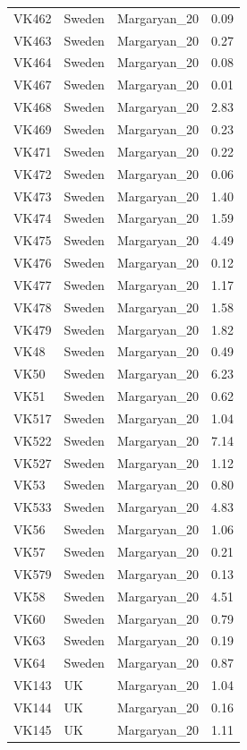 \begin{longtable}[t]{lllr}
VK462 & Sweden & Margaryan\_20 & 0.09\\
VK463 & Sweden & Margaryan\_20 & 0.27\\
VK464 & Sweden & Margaryan\_20 & 0.08\\
VK467 & Sweden & Margaryan\_20 & 0.01\\
VK468 & Sweden & Margaryan\_20 & 2.83\\
VK469 & Sweden & Margaryan\_20 & 0.23\\
VK471 & Sweden & Margaryan\_20 & 0.22\\
VK472 & Sweden & Margaryan\_20 & 0.06\\
VK473 & Sweden & Margaryan\_20 & 1.40\\
VK474 & Sweden & Margaryan\_20 & 1.59\\
VK475 & Sweden & Margaryan\_20 & 4.49\\
VK476 & Sweden & Margaryan\_20 & 0.12\\
VK477 & Sweden & Margaryan\_20 & 1.17\\
VK478 & Sweden & Margaryan\_20 & 1.58\\
VK479 & Sweden & Margaryan\_20 & 1.82\\
VK48 & Sweden & Margaryan\_20 & 0.49\\
VK50 & Sweden & Margaryan\_20 & 6.23\\
VK51 & Sweden & Margaryan\_20 & 0.62\\
VK517 & Sweden & Margaryan\_20 & 1.04\\
VK522 & Sweden & Margaryan\_20 & 7.14\\
VK527 & Sweden & Margaryan\_20 & 1.12\\
VK53 & Sweden & Margaryan\_20 & 0.80\\
VK533 & Sweden & Margaryan\_20 & 4.83\\
VK56 & Sweden & Margaryan\_20 & 1.06\\
VK57 & Sweden & Margaryan\_20 & 0.21\\
VK579 & Sweden & Margaryan\_20 & 0.13\\
VK58 & Sweden & Margaryan\_20 & 4.51\\
VK60 & Sweden & Margaryan\_20 & 0.79\\
VK63 & Sweden & Margaryan\_20 & 0.19\\
VK64 & Sweden & Margaryan\_20 & 0.87\\
VK143 & UK & Margaryan\_20 & 1.04\\
VK144 & UK & Margaryan\_20 & 0.16\\
VK145 & UK & Margaryan\_20 & 1.11\\

\end{longtable}
